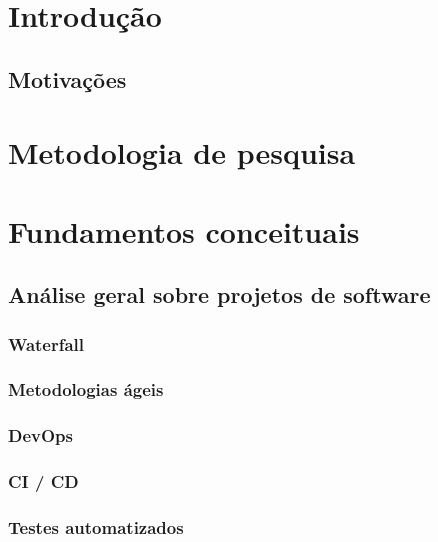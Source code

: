 \documentclass[]{../class/politex}
\begin{document}
  \capa
  \falsafolhaderosto
  \folhaderosto

  \sumario

  \begin{resumo}
  \end{resumo}

  \chapter{Introdução}

    \section{Motivações}

  \chapter{Metodologia de pesquisa}

  

  \chapter{Fundamentos conceituais}

    \section{Análise geral sobre projetos de software}

      \subsection{Waterfall}

      \subsection{Metodologias ágeis}

      \subsection{DevOps}

      \subsection{CI / CD}

      \subsection{Testes automatizados}
\end{document}
